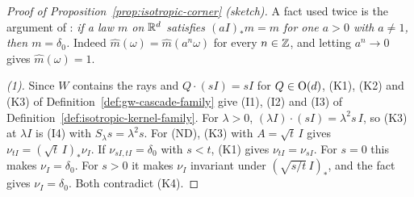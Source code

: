 \begin{proof}[Proof of Proposition~\ref{prop:isotropic-corner} (sketch)]
A fact used twice is the argument of : \emph{if a law $m$ on $\mathbb{R}^d$ satisfies
$(aI)_*m = m$ for one $a > 0$ with $a \ne 1$, then $m = \delta_0$.} Indeed
$\widehat m(\omega) = \widehat m(a^n\omega)$ for every $n \in \mathbb{Z}$, and letting $a^n \to 0$ gives
$\widehat m(\omega) = 1$.

\emph{(1).} Since $W$ contains the rays and $Q \cdot (sI) = sI$ for $Q \in \mathrm{O}(d)$, (K1), (K2)
and (K3) of Definition~\ref{def:gw-cascade-family} give (I1), (I2) and (I3) of
Definition~\ref{def:isotropic-kernel-family}. For
$\lambda > 0$, $(\lambda I) \cdot (sI) = \lambda^2 s\,I$, so (K3) at $\lambda I$ is (I4) with
$S_\lambda s = \lambda^2 s$. For (ND), (K3) with $A = \sqrt t\,I$ gives
$\nu_{tI} = (\sqrt t\,I)_*\nu_I$. If $\nu_{sI,tI} = \delta_0$ with $s < t$, (K1) gives
$\nu_{tI} = \nu_{sI}$. For $s = 0$ this makes $\nu_I = \delta_0$. For $s > 0$ it makes $\nu_I$
invariant under $(\sqrt{s/t}\,I)_*$, and the fact gives $\nu_I = \delta_0$. Both contradict (K4).


\end{proof}
